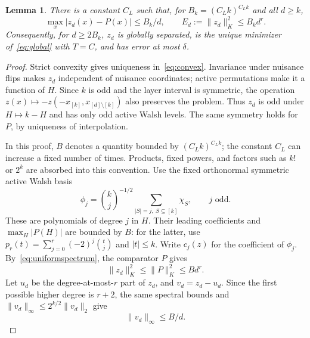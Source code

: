 \documentclass[11pt,a4paper]{article}
\newtheorem{lemma}[theorem]{Lemma}
\theoremstyle{remark}\newtheorem{remark}[theorem]{Remark}
\newcommand{\normK}[1]{\lVert #1\rVert_K}
\begin{document}
\begin{lemma}\label{lem:interpolant}
There is a constant $C_L$ such that, for $B_k=(C_Lk)^{C_Lk}$ and
all $d\ge k$,
\[
 \max_x|z_d(x)-P(x)|\le B_k/d,\qquad
 E_d:=\normK{z_d}^2\le B_kd^r.
\]
Consequently, for $d\ge2B_k$, $z_d$ is globally separated, is the unique
minimizer of~\eqref{eq:global} with $T=C$, and has error at most $\delta$.
\end{lemma}
\begin{proof}
Strict convexity gives uniqueness in~\eqref{eq:convex}. Invariance under
nuisance flips makes $z_d$ independent of nuisance coordinates; active
permutations make it a function of $H$. Since $k$ is odd and the layer
interval is symmetric, the operation $z(x)\mapsto-z(-x_{[k]},x_{[d]\setminus[k]})$
also preserves the problem. Thus $z_d$ is odd under $H\mapsto k-H$ and
has only odd active Walsh levels. The same symmetry holds for $P$, by
uniqueness of interpolation.

In this proof, $B$ denotes a quantity bounded by $(C_Lk)^{C_Lk}$; the
constant $C_L$ can increase a fixed number of times. Products, fixed powers,
and factors such as $k!$ or $2^k$ are absorbed into this convention.
Use the fixed orthonormal symmetric active Walsh basis
\[
 \phi_j=\binom kj^{-1/2}\sum_{|S|=j,\ S\subseteq[k]}\chi_S,
 \qquad j\text{ odd}.
\]
These are polynomials of degree $j$ in $H$. Their leading coefficients
and $\max_H|P(H)|$ are bounded by $B$: for the latter, use
$p_r(t)=\sum_{j=0}^r(-2)^j\binom tj$ and $|t|\le k$.
Write $c_j(z)$ for the coefficient of $\phi_j$.
By~\eqref{eq:uniformspectrum}, the comparator $P$ gives
\[
 \normK{z_d}^2\le\normK P^2\le Bd^r.
\]
Let $u_d$ be the degree-at-most-$r$ part of $z_d$, and $v_d=z_d-u_d$.
Since the first possible higher degree is $r+2$, the same spectral bounds
and $\|v_d\|_\infty\le2^{k/2}\|v_d\|_2$ give
\begin{equation}\label{eq:highpart}
 \|v_d\|_\infty\le B/d.
\end{equation}


\end{proof}
\end{document}
